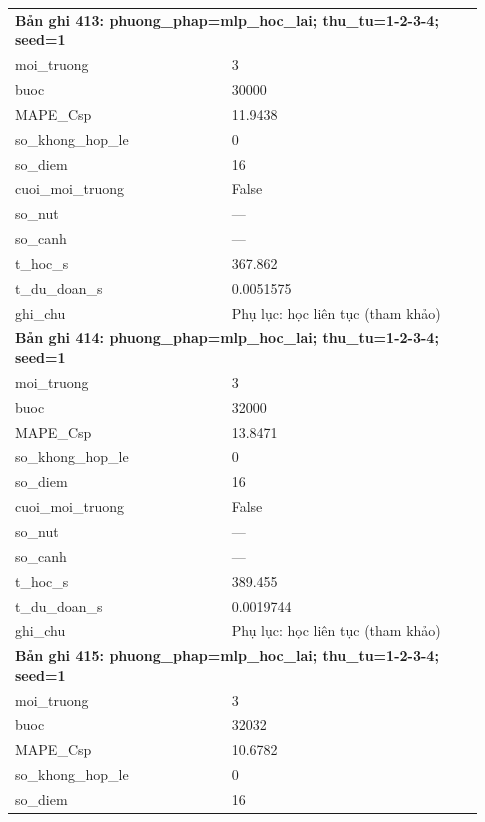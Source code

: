 \begin{longtable}{p{0.43\linewidth}p{0.50\linewidth}}
\midrule
\multicolumn{2}{p{0.95\linewidth}}{\textbf{Bản ghi 413: phuong\_phap=mlp\_hoc\_lai; thu\_tu=1-2-3-4; seed=1}} \\
moi\_\allowbreak truong & 3 \\
buoc & 30000 \\
MAPE\_\allowbreak Csp & 11.9438 \\
so\_\allowbreak khong\_\allowbreak hop\_\allowbreak le & 0 \\
so\_\allowbreak diem & 16 \\
cuoi\_\allowbreak moi\_\allowbreak truong & False \\
so\_\allowbreak nut & — \\
so\_\allowbreak canh & — \\
t\_\allowbreak hoc\_\allowbreak s & 367.862 \\
t\_\allowbreak du\_\allowbreak doan\_\allowbreak s & 0.0051575 \\
ghi\_\allowbreak chu & Phụ lục: học liên tục (tham khảo) \\
\midrule
\multicolumn{2}{p{0.95\linewidth}}{\textbf{Bản ghi 414: phuong\_phap=mlp\_hoc\_lai; thu\_tu=1-2-3-4; seed=1}} \\
moi\_\allowbreak truong & 3 \\
buoc & 32000 \\
MAPE\_\allowbreak Csp & 13.8471 \\
so\_\allowbreak khong\_\allowbreak hop\_\allowbreak le & 0 \\
so\_\allowbreak diem & 16 \\
cuoi\_\allowbreak moi\_\allowbreak truong & False \\
so\_\allowbreak nut & — \\
so\_\allowbreak canh & — \\
t\_\allowbreak hoc\_\allowbreak s & 389.455 \\
t\_\allowbreak du\_\allowbreak doan\_\allowbreak s & 0.0019744 \\
ghi\_\allowbreak chu & Phụ lục: học liên tục (tham khảo) \\
\midrule
\multicolumn{2}{p{0.95\linewidth}}{\textbf{Bản ghi 415: phuong\_phap=mlp\_hoc\_lai; thu\_tu=1-2-3-4; seed=1}} \\
moi\_\allowbreak truong & 3 \\
buoc & 32032 \\
MAPE\_\allowbreak Csp & 10.6782 \\
so\_\allowbreak khong\_\allowbreak hop\_\allowbreak le & 0 \\
so\_\allowbreak diem & 16 \\

\end{longtable}
